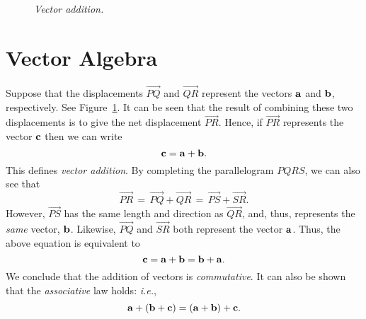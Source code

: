 \begin{figure}
\epsfysize=2.25in
\centerline{}
\caption{\em Vector addition.}\label{fig2}
\end{figure}

\section{Vector Algebra}
Suppose that the displacements $\stackrel{\displaystyle \rightarrow}{PQ}$ and  $\stackrel{\displaystyle \rightarrow}{QR}$
represent the vectors ${\bf a}$ and ${\bf b}$, respectively. See Figure~\ref{fig2}. It can be seen that the result
of combining these two displacements is to give the net displacement $\stackrel{\displaystyle \rightarrow}{PR}$. Hence,
if
 $\stackrel{\displaystyle \rightarrow}{PR}$ represents the vector ${\bf c}$ then we can write
 \begin{equation}
 {\bf c} = {\bf a} + {\bf b}.
 \end{equation}
 This defines {\em vector addition}. 
 By completing the parallelogram $PQRS$, we can also see that
 \begin{equation}
 \stackrel{\displaystyle \rightarrow}{PR} \,= \, \stackrel{\displaystyle \rightarrow}{PQ}+\stackrel{\displaystyle \rightarrow}{QR}\,=\, 
  \stackrel{\displaystyle \rightarrow}{PS}+\stackrel{\displaystyle \rightarrow}{SR}.
  \end{equation}
However, $\stackrel{\displaystyle \rightarrow}{PS}$ has the same length and direction as $\stackrel{\displaystyle \rightarrow}{QR}$,
and, thus, represents the {\em same}\/ vector, ${\bf b}$. Likewise,  $\stackrel{\displaystyle \rightarrow}{PQ}$ and $\stackrel{\displaystyle \rightarrow}{SR}$ both represent the vector ${\bf a}$. Thus, the above equation is equivalent to
\begin{equation}
{\bf c} = {\bf a} + {\bf b} = {\bf b} + {\bf a}.
\end{equation}
We conclude that the addition of vectors is  {\em commutative}.  It can also
be shown that the {\em associative}\/ law  holds: {\em i.e.}, 
\begin{equation}
{\bf a} +
 ({\bf b} + {\bf c}) = ({\bf a} + {\bf b}) + {\bf c}.
 \end{equation}

